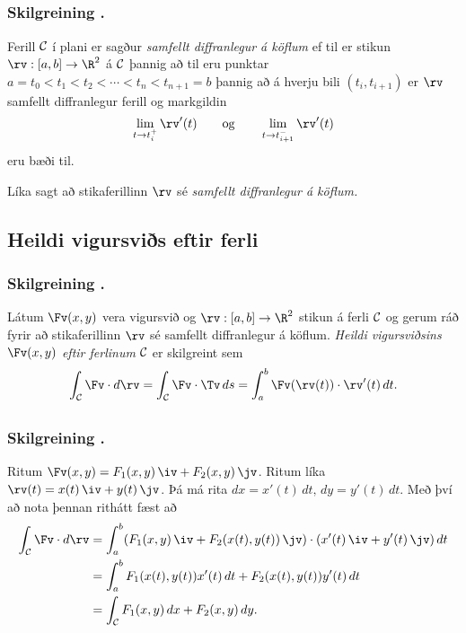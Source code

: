\subsection{} 

\subsubsection{Skilgreining \kaflanr.}
Ferill $\cal C$ í plani er sagður {\em samfellt diffranlegur á köflum} ef til er stikun $\rv:[a,b]\rightarrow \R^2$ á $\cal C$ þannig að  til eru punktar $a=t_0<t_1<t_2<\cdots<t_n<t_{n+1}=b$ þannig að á hverju bili $(t_i,t_{i+1})$ er $\rv$ samfellt diffranlegur ferill og markgildin
$$\lim_{t\rightarrow t_i^+}\rv'(t)\qquad\mbox{og}\qquad 
\lim_{t\rightarrow t_{i+1}^-}\rv'(t)$$
eru bæði til.  

Líka sagt að stikaferillinn $\rv$ sé {\em samfellt diffranlegur á köflum.}






\subsection{Heildi vigursviðs eftir ferli} 

\subsubsection{Skilgreining \kaflanr.}
Látum $\Fv(x,y)$ vera vigursvið og $\rv:[a,b]\rightarrow \R^2$ stikun á ferli $\cal C$ og gerum ráð fyrir að stikaferillinn $\rv$ sé samfellt diffranlegur á köflum.  {\em Heildi vigursviðsins $\Fv(x,y)$ eftir ferlinum} $\cal C$ er skilgreint sem 
$$\int_{\cal C} \Fv\cdot d\rv= \int_{\cal C} \Fv\cdot \Tv\,ds
=\int_a^b \Fv(\rv(t))\cdot \rv'(t)\,dt.$$






\subsection{} 

\subsubsection{Skilgreining \kaflanr.}
Ritum $\Fv(x,y)=F_1(x,y)\,\iv+F_2(x,y)\,\jv$.  Ritum líka $\rv(t)=x(t)\,\iv+y(t)\,\jv$.  Þá má rita
$dx=x'(t)\,dt,\, dy=y'(t)\,dt$.  Með því að nota þennan rithátt fæst að 
\begin{align*}
\int_{\cal C}\Fv\cdot d\rv&=\int_a^b
(F_1(x,y)\,\iv+F_2(x(t),y(t))\,\jv)\cdot(x'(t)\,\iv+y'(t)\,\jv)\,dt\\
&=\int_a^b F_1(x(t),y(t))x'(t)\,dt+F_2(x(t),y(t))y'(t)\,dt\\
&=\int_{\cal C} F_1(x,y)\,dx+F_2(x,y)\,dy.
\end{align*}







